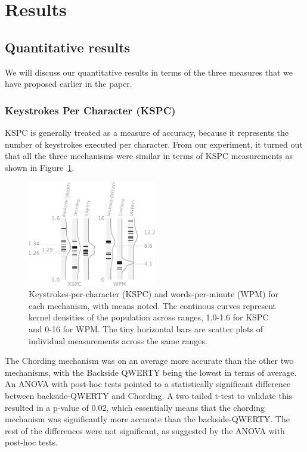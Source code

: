 \section{Results}
\subsection{Quantitative results}

We will discuss our quantitative results in terms of the three
measures that we have proposed earlier in the paper.

\subsubsection{Keystrokes Per Character (KSPC)}

KSPC is generally treated as a measure of accuracy, because it
represents the number of keystrokes executed per character. From our
experiment, it turned out that all the three mechanisms were similar
in terms of KSPC measurements as shown in
Figure~\ref{fig:kspc_and_wpm}.

\begin{figure}
    \includegraphics[width=0.5\textwidth]{Figures/kspc_and_wpm.pdf} 
    \caption{Keystrokes-per-character (KSPC) and words-per-minute (WPM) for each mechanism, with means noted. The continous curves represent kernel densities of the population across ranges, 1.0-1.6 for KSPC and 0-16 for WPM. The tiny horizontal bars are scatter plots of individual measurements across the same ranges.}
    \label{fig:kspc_and_wpm}
\end{figure}

The Chording mechanism was on an average more accurate than the other two
mechanisms, with the Backside QWERTY being the lowest in terms of
average. An ANOVA with post-hoc tests pointed to a  statistically significant difference between backside-QWERTY and Chording. A two tailed t-test to validate this resulted in a p-value of 0.02, which essentially means that the chording mechanism was significantly more accurate than the backside-QWERTY. The rest of the differences were not significant, as suggested by the ANOVA with post-hoc tests. 


